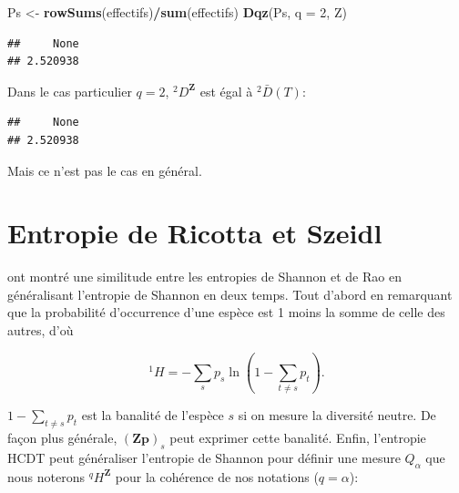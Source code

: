 \documentclass[
  11pt,
  french,
  a4paper,
  extrafontsizes,onecolumn,openright
  ]{memoir}
\newenvironment{Shaded}{\begin{snugshade}}{\end{snugshade}}
\newcommand{\AttributeTok}[1]{\textcolor[rgb]{0.13,0.29,0.53}{#1}}
\newcommand{\DecValTok}[1]{\textcolor[rgb]{0.00,0.00,0.81}{#1}}
\newcommand{\FunctionTok}[1]{\textcolor[rgb]{0.13,0.29,0.53}{\textbf{#1}}}
\newcommand{\NormalTok}[1]{#1}
\newcommand{\OtherTok}[1]{\textcolor[rgb]{0.56,0.35,0.01}{#1}}
\newcommand{\SpecialCharTok}[1]{\textcolor[rgb]{0.81,0.36,0.00}{\textbf{#1}}}
\begin{document}
\begin{Shaded}
\begin{Highlighting}[]
\NormalTok{Ps }\OtherTok{\textless{}{-}} \FunctionTok{rowSums}\NormalTok{(effectifs)}\SpecialCharTok{/}\FunctionTok{sum}\NormalTok{(effectifs)}
\FunctionTok{Dqz}\NormalTok{(Ps, }\AttributeTok{q =} \DecValTok{2}\NormalTok{, Z)}
\end{Highlighting}
\end{Shaded}

\begin{verbatim}
##     None 
## 2.520938
\end{verbatim}

\normalsize

Dans le cas particulier \(q=2\), \(^2\!D^{\mathbf{Z}}\) est égal à \(^{2}\!\bar{D}(T)\):

\scriptsize

\begin{Shaded}
\end{Shaded}

\begin{verbatim}
##     None 
## 2.520938
\end{verbatim}

\normalsize

Mais ce n'est pas le cas en général.

\section{Entropie de Ricotta et Szeidl}\label{entropie-de-ricotta-et-szeidl}

\textcite{Ricotta2006b} ont montré une similitude entre les entropies de Shannon et de Rao en généralisant l'entropie de Shannon en deux temps.
Tout d'abord en remarquant que la probabilité d'occurrence d'une espèce est 1 moins la somme de celle des autres, d'où

\begin{equation}
  \label{eq:Ricotta2006bH1}
  ^{1}\!H = -\sum_s{p_s\ln\left(1-\sum_{t\ne s}{p_t}\right)}.
\end{equation}

\(1-\sum_{t\ne s}{p_t}\) est la banalité de l'espèce \(s\) si on mesure la diversité neutre.
De façon plus générale, \({(\mathbf{Zp})}_s\) peut exprimer cette banalité.
Enfin, l'entropie HCDT peut généraliser l'entropie de Shannon pour définir une mesure \(Q_{\alpha}\) que nous noterons \(^q\!H^{\mathbf{Z}}\) pour la cohérence de nos notations (\(q=\alpha\)):
\end{document}
